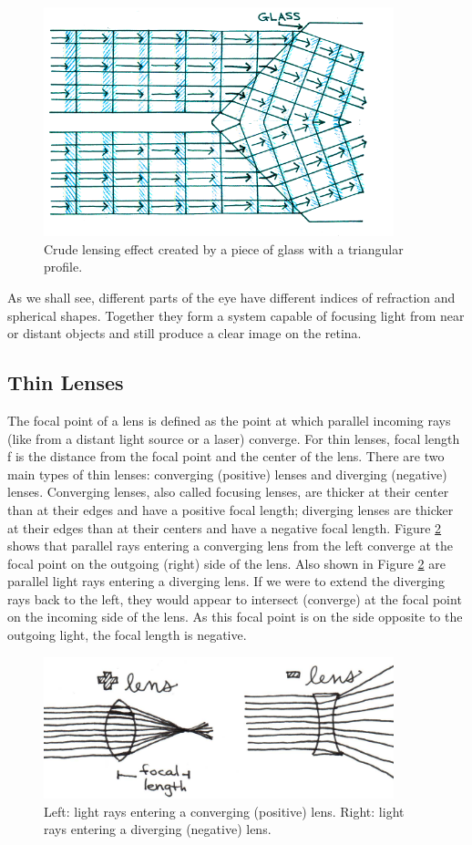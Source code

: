 \begin{figure}[h]
	\centering
	\includegraphics[width=4.0in]{./figures/Topic5/Fig5-3.png}
	\caption{Crude lensing effect created by a piece of glass with a triangular profile.}
	\label{Fig5-3}
\end{figure}

As we shall see, different parts of the eye have different indices of refraction and spherical shapes. Together they form a system capable of focusing light from near or distant objects and still produce a clear image on the retina.

\subsection{Thin Lenses} 

The focal point of a lens is defined as the point at which parallel incoming rays (like from a distant light source or a laser) converge. For thin lenses, focal length f is the distance from the focal point and the center of the lens.  
There are two main types of thin lenses: converging (positive) lenses and diverging (negative) lenses.  Converging lenses, also called focusing lenses, are thicker at their center than at their edges and have a positive focal length; diverging lenses are thicker at their edges than at their centers and have a negative focal length.  Figure \ref{Fig5-4} shows that parallel rays entering a converging lens from the left converge at the focal point on the outgoing (right) side of the lens.   Also shown in Figure \ref{Fig5-4} are parallel light rays entering a diverging lens.  If we were to extend the diverging rays back to the left, they would appear to intersect (converge) at the focal point on the incoming side of the lens.  As this focal point is on the side opposite to the outgoing light, the focal length is negative.  
\begin{figure}[h]
	\centering
	\includegraphics[width=4.0in]{./figures/Topic5/Fig5-4.jpg}
	\caption{Left: light rays entering a converging (positive) lens.  Right: light rays entering a diverging (negative) lens.}
	\label{Fig5-4}
\end{figure}

